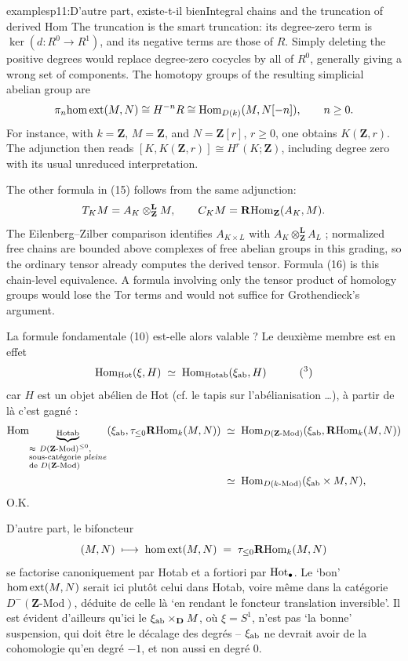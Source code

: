 \begin{dcomment}{examples}{p11:D’autre part, existe-t-il bien}{Integral chains and the truncation of derived Hom}
The truncation is the smart truncation: its degree-zero term is \(\ker(d:R^0\to R^1)\), and its negative terms are those of \(R\). Simply deleting the positive degrees would replace degree-zero cocycles by all of \(R^0\), generally giving a wrong set of components. The homotopy groups of the resulting simplicial abelian group are
\[
 \pi_n\mathrm{hom}\,\mathrm{ext}(M,N)
 \cong H^{-n}R
 \cong\mathrm{Hom}_{D(k)}(M,N[-n]),\qquad n\geq0.
\]
For instance, with \(k=\mathbf Z\), \(M=\mathbf Z\), and \(N=\mathbf Z[r]\), \(r\geq0\), one obtains \(K(\mathbf Z,r)\). The adjunction then reads
\([K,K(\mathbf Z,r)]\cong H^r(K;\mathbf Z)\), including degree zero with its usual unreduced interpretation.

The other formula in (15) follows from the same adjunction:
\[
 T_KM=A_K\otimes_{\mathbf Z}^{\mathbf L}M,\qquad
 C_KM=\mathbf R\mathrm{Hom}_{\mathbf Z}(A_K,M).
\]
The Eilenberg--Zilber comparison identifies \(A_{K\times L}\) with \(A_K\otimes_{\mathbf Z}^{\mathbf L}A_L\) \citep[Section 1, theorem, pp.~200--201]{EilenbergZilber1953}; normalized free chains are bounded above complexes of free abelian groups in this grading, so the ordinary tensor already computes the derived tensor. Formula (16) is this chain-level equivalence. A formula involving only the tensor product of homology groups would lose the Tor terms and would not suffice for Grothendieck's argument.
\end{dcomment}


La formule fondamentale (10) est-elle alors valable ? Le deuxième membre est en effet
\[
\Hom_{\Hot}(\xi,H)\;\simeq\;\Hom_{\mathrm{Hotab}}(\xi_{\ab},H)\qquad\quad\text{(\footnotemark[3])}
\]
car $H$ est un objet abélien de Hot (cf. le tapis sur l’abélianisation \ldots), à partir de là c’est gagné :
\[
\begin{aligned}
\Hom_{\underbrace{\scriptstyle\mathrm{Hotab}}_{\begin{subarray}{l}\approx\ D(\mathbf{Z}\text{-Mod})^{\le 0},\\ \text{sous-catégorie \textit{pleine}}\\ \text{de }D(\mathbf{Z}\text{-Mod})\end{subarray}}}(\xi_{\ab},\tau_{\le 0}\RHom_k(M,N)) &\;\simeq\;\Hom_{D(\mathbf{Z}\text{-Mod})}(\xi_{\ab},\RHom_k(M,N))\\
&\;\simeq\;\Hom_{D(k\text{-Mod})}(\xi_{\ab}\times M,N),
\end{aligned}
\]
O.K.

D’autre part, le bifoncteur
\[
(M,N)\;\longmapsto\;\mathrm{hom}\,\mathrm{ext}(M,N)\;=\;\tau_{\le 0}\mathbf{R}\mathrm{Hom}_k(M,N)
\]
se factorise canoniquement par Hotab et a fortiori par $\mathrm{Hot}_{\bullet}$. Le ‘bon’ $\mathrm{hom}\,\mathrm{ext}(M,N)$ serait ici plutôt celui dans Hotab, voire même dans la catégorie $D^{-}(\mathbf{Z}\text{-Mod})$, déduite de celle là ‘en rendant le foncteur translation inversible’. Il est évident d’ailleurs qu’ici le $\xi_{\mathrm{ab}}\times_{\mathbf{D}}M$, où $\xi=S^1$, n’est pas ‘la bonne’ suspension, qui doit être le décalage des degrés – $\xi_{\mathrm{ab}}$ ne devrait avoir de la cohomologie qu’en degré $-1$, et non aussi en degré $0$.

